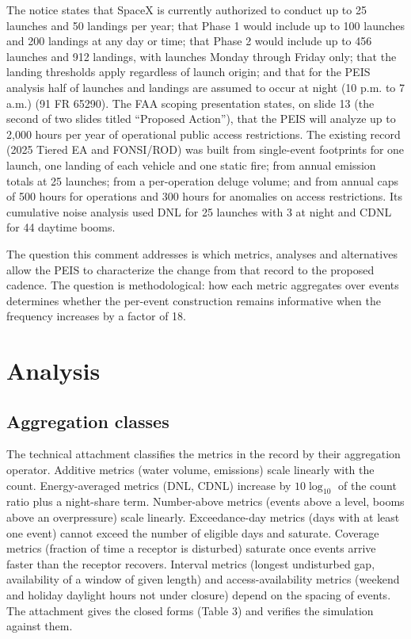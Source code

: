 \documentclass[11pt]{article}
\begin{document}
The notice states that SpaceX is currently authorized to conduct up to 25 launches and 50 landings per year; that Phase 1 would include up to 100 launches and 200 landings at any day or time; that Phase 2 would include up to 456 launches and 912 landings, with launches Monday through Friday only; that the landing thresholds apply regardless of launch origin; and that for the PEIS analysis half of launches and landings are assumed to occur at night (10 p.m. to 7 a.m.) (91 FR 65290). The FAA scoping presentation states, on slide 13 (the second of two slides titled ``Proposed Action''), that the PEIS will analyze up to 2,000 hours per year of operational public access restrictions. The existing record (2025 Tiered EA and FONSI/ROD) was built from single-event footprints for one launch, one landing of each vehicle and one static fire; from annual emission totals at 25 launches; from a per-operation deluge volume; and from annual caps of 500 hours for operations and 300 hours for anomalies on access restrictions. Its cumulative noise analysis used DNL for 25 launches with 3 at night and CDNL for 44 daytime booms.

The question this comment addresses is which metrics, analyses and alternatives allow the PEIS to characterize the change from that record to the proposed cadence. The question is methodological: how each metric aggregates over events determines whether the per-event construction remains informative when the frequency increases by a factor of 18.

\section{Analysis}

\subsection{Aggregation classes}

The technical attachment classifies the metrics in the record by their aggregation operator. Additive metrics (water volume, emissions) scale linearly with the count. Energy-averaged metrics (DNL, CDNL) increase by $10\log_{10}$ of the count ratio plus a night-share term. Number-above metrics (events above a level, booms above an overpressure) scale linearly. Exceedance-day metrics (days with at least one event) cannot exceed the number of eligible days and saturate. Coverage metrics (fraction of time a receptor is disturbed) saturate once events arrive faster than the receptor recovers. Interval metrics (longest undisturbed gap, availability of a window of given length) and access-availability metrics (weekend and holiday daylight hours not under closure) depend on the spacing of events. The attachment gives the closed forms (Table 3) and verifies the simulation against them.
\end{document}
